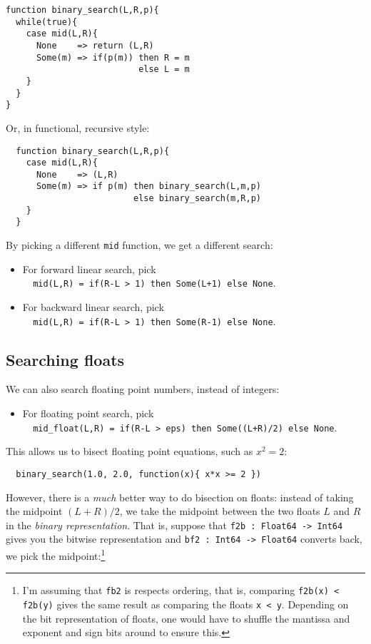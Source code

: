 \documentclass[a4paper, 11pt]{article}
\begin{document}
\begin{minipage}{\linewidth}
\begin{lstlisting}
function binary_search(L,R,p){
  while(true){
    case mid(L,R){
      None    => return (L,R)
      Some(m) => if(p(m)) then R = m
                          else L = m
    }
  }
}
\end{lstlisting}
\end{minipage}

\noindent Or, in functional, recursive style:

\begin{lstlisting}
  function binary_search(L,R,p){
    case mid(L,R){
      None    => (L,R)
      Some(m) => if p(m) then binary_search(L,m,p)
                         else binary_search(m,R,p)
    }
  }
\end{lstlisting}

\noindent By picking a different \lstinline|mid| function, we get a different search:
\begin{itemize}
  \item For forward linear search, pick \\ \lstinline|  mid(L,R) = if(R-L > 1) then Some(L+1) else None|.
  \item For backward linear search, pick \\ \lstinline|  mid(L,R) = if(R-L > 1) then Some(R-1) else None|.
\end{itemize}

\subsection{Searching floats}

\noindent We can also search floating point numbers, instead of integers:
\begin{itemize}
  \item For floating point search, pick \\ \lstinline|  mid_float(L,R) = if(R-L > eps) then Some((L+R)/2) else None|.
\end{itemize}

\noindent This allows us to bisect floating point equations, such as $x^2 = 2$:

\begin{lstlisting}
  binary_search(1.0, 2.0, function(x){ x*x >= 2 })
\end{lstlisting}

\noindent However, there is a \emph{much} better way to do bisection on floats: instead of taking the midpoint $(L+R)/2$, we take the midpoint between the two floats $L$ and $R$ in the \emph{binary representation}. That is, suppose that \lstinline|f2b : Float64 -> Int64| gives you the bitwise representation and \lstinline|bf2 : Int64 -> Float64| converts back, we pick the midpoint:\footnote{I'm assuming that \lstinline|fb2| is respects ordering, that is, comparing \lstinline|f2b(x) < f2b(y)| gives the same result as comparing the floats \lstinline|x < y|. Depending on the bit representation of floats, one would have to shuffle the mantissa and exponent and sign bits around to ensure this.}
\end{document}
